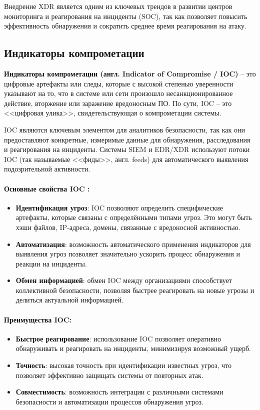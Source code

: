 Внедрение XDR является одним из ключевых трендов в развитии центров мониторинга и реагирования на инциденты (SOC), так как позволяет повысить эффективность обнаружения и сократить среднее время реагирования на атаку.

\subsection{Индикаторы компрометации}

\textbf{Индикаторы компрометации (англ. Indicator of Compromise / IOC)} -- это цифровые артефакты или следы, которые с высокой степенью уверенности указывают на то, что в системе или сети произошло несанкционированное действие, вторжение или заражение вредоносным ПО. По сути, IOC -- это <<цифровая улика>>, свидетельствующая о компрометации системы.

IOC являются ключевым элементом для аналитиков безопасности, так как они предоставляют конкретные, измеримые данные для обнаружения, расследования и реагирования на инциденты. Системы SIEM и EDR/XDR используют потоки IOC (так называемые <<фиды>>, англ. feeds) для автоматического выявления подозрительной активности.

\paragraph*{Основные свойства IOC \autocite{IDSClassification}:}
\begin{itemize}
    \item \textbf{Идентификация угроз}: IOC позволяют определить специфические артефакты, которые связаны с определёнными типами угроз. Это могут быть хэши файлов, IP-адреса, домены, связанные с вредоносной активностью.
    \item \textbf{Автоматизация}: возможность автоматического применения индикаторов для выявления угроз позволяет значительно ускорить процесс обнаружения и реакции на инциденты.
    \item \textbf{Обмен информацией}: обмен IOC между организациями способствует коллективной безопасности, позволяя быстрее реагировать на новые угрозы и делиться актуальной информацией.
\end{itemize}

\paragraph*{Преимущества IOC:}
\begin{itemize}
    \item \textbf{Быстрое реагирование}: использование IOC позволяет оперативно обнаруживать и реагировать на инциденты, минимизируя возможный ущерб.
    \item \textbf{Точность}: высокая точность при идентификации известных угроз, что позволяет эффективно защищать системы от повторных атак.
    \item \textbf{Совместимость}: возможность интеграции с различными системами безопасности и автоматизации процессов обнаружения угроз.
\end{itemize}

